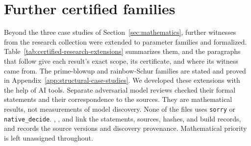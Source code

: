 \section{Further certified families}
\label{app:research-extensions}
\label{app:projective-cubes}
\label{app:research-provenance-corrections}
Beyond the three case studies of Section~\ref{sec:mathematics}, further witnesses from the research collection were extended to parameter families and formalized. Table~\ref{tab:certified-research-extensions} summarizes them, and the paragraphs that follow give each result's exact scope, its certificate, and where its witness came from. The prime-blowup and rainbow-Schur families are stated and proved in Appendix~\ref{app:structural-case-studies}. We developed these extensions with the help of AI tools. Separate adversarial model reviews checked their formal statements and their correspondence to the sources. They are mathematical results, not measurements of model discovery. None of the files uses \texttt{sorry} or \texttt{native\_decide}. , , and  link the statements, sources, hashes, and build records, and  records the source versions and discovery provenance. Mathematical priority is left unassigned throughout.

